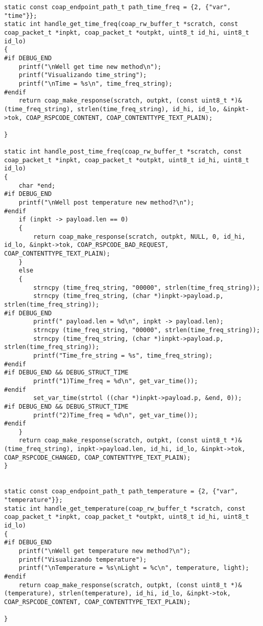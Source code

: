 \begin{lstlisting}
static const coap_endpoint_path_t path_time_freq = {2, {"var", "time"}};
static int handle_get_time_freq(coap_rw_buffer_t *scratch, const coap_packet_t *inpkt, coap_packet_t *outpkt, uint8_t id_hi, uint8_t id_lo)
{
#if DEBUG_END
	printf("\nWell get time new method\n");
	printf("Visualizando time_string");
	printf("\nTime = %s\n", time_freq_string);
#endif
	return coap_make_response(scratch, outpkt, (const uint8_t *)&(time_freq_string), strlen(time_freq_string), id_hi, id_lo, &inpkt->tok, COAP_RSPCODE_CONTENT, COAP_CONTENTTYPE_TEXT_PLAIN);

}

static int handle_post_time_freq(coap_rw_buffer_t *scratch, const coap_packet_t *inpkt, coap_packet_t *outpkt, uint8_t id_hi, uint8_t id_lo)
{
	char *end;
#if DEBUG_END
	printf("\nWell post temperature new method?\n");
#endif
	if (inpkt -> payload.len == 0)
	{
		return coap_make_response(scratch, outpkt, NULL, 0, id_hi, id_lo, &inpkt->tok, COAP_RSPCODE_BAD_REQUEST, COAP_CONTENTTYPE_TEXT_PLAIN);
	}
	else
	{
		strncpy (time_freq_string, "00000", strlen(time_freq_string));
		strncpy (time_freq_string, (char *)inpkt->payload.p, strlen(time_freq_string));
#if DEBUG_END
		printf(" payload.len = %d\n", inpkt -> payload.len);
		strncpy (time_freq_string, "00000", strlen(time_freq_string));
		strncpy (time_freq_string, (char *)inpkt->payload.p, strlen(time_freq_string));
		printf("Time_fre_string = %s", time_freq_string);
#endif
#if DEBUG_END && DEBUG_STRUCT_TIME
		printf("1)Time_freq = %d\n", get_var_time());
#endif		
		set_var_time(strtol ((char *)inpkt->payload.p, &end, 0));
#if DEBUG_END && DEBUG_STRUCT_TIME
		printf("2)Time_freq = %d\n", get_var_time());
#endif
	}
	return coap_make_response(scratch, outpkt, (const uint8_t *)&(time_freq_string), inpkt->payload.len, id_hi, id_lo, &inpkt->tok, COAP_RSPCODE_CHANGED, COAP_CONTENTTYPE_TEXT_PLAIN);
}


static const coap_endpoint_path_t path_temperature = {2, {"var", "temperature"}};
static int handle_get_temperature(coap_rw_buffer_t *scratch, const coap_packet_t *inpkt, coap_packet_t *outpkt, uint8_t id_hi, uint8_t id_lo)
{
#if DEBUG_END
	printf("\nWell get temperature new method?\n");
	printf("Visualizando temperature");
	printf("\nTemperature = %s\nLight = %c\n", temperature, light);
#endif
	return coap_make_response(scratch, outpkt, (const uint8_t *)&(temperature), strlen(temperature), id_hi, id_lo, &inpkt->tok, COAP_RSPCODE_CONTENT, COAP_CONTENTTYPE_TEXT_PLAIN);

}


\end{lstlisting}
